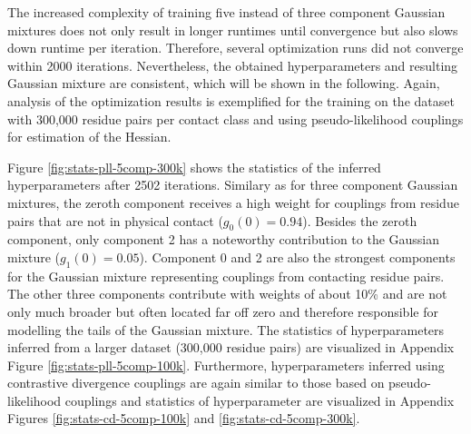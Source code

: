 \documentclass[11pt,a4paper,twoside]{book}
\newcommand{\eq}{\!=\!}
\theoremstyle{definition}
\theoremstyle{definition}
\theoremstyle{remark}
\begin{document}
The increased complexity of training five instead of three component
Gaussian mixtures does not only result in longer runtimes until
convergence but also slows down runtime per iteration. Therefore,
several optimization runs did not converge within 2000 iterations.
Nevertheless, the obtained hyperparameters and resulting Gaussian
mixture are consistent, which will be shown in the following. Again,
analysis of the optimization results is exemplified for the training on
the dataset with 300,000 residue pairs per contact class and using
pseudo-likelihood couplings for estimation of the Hessian.

Figure \ref{fig:stats-pll-5comp-300k} shows the statistics of the
inferred hyperparameters after 2502 iterations. Similary as for three
component Gaussian mixtures, the zeroth component receives a high weight
for couplings from residue pairs that are not in physical contact
(\(g_0(0) \eq 0.94\)). Besides the zeroth component, only component 2
has a noteworthy contribution to the Gaussian mixture
(\(g_1(0) \eq 0.05\)). Component 0 and 2 are also the strongest
components for the Gaussian mixture representing couplings from
contacting residue pairs. The other three components contribute with
weights of about 10\% and are not only much broader but often located
far off zero and therefore responsible for modelling the tails of the
Gaussian mixture. The statistics of hyperparameters inferred from a
larger dataset (300,000 residue pairs) are visualized in Appendix Figure
\ref{fig:stats-pll-5comp-100k}. Furthermore, hyperparameters inferred
using contrastive divergence couplings are again similar to those based
on pseudo-likelihood couplings and statistics of hyperparameter are
visualized in Appendix Figures \ref{fig:stats-cd-5comp-100k} and
\ref{fig:stats-cd-5comp-300k}.
\end{document}
